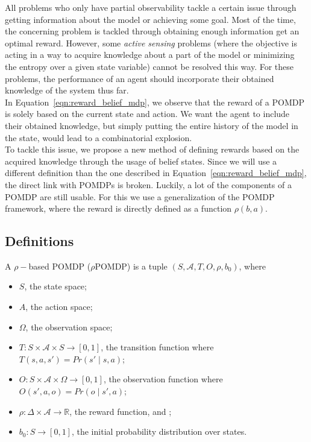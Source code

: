 All problems who only have partial observability tackle a certain issue through getting information about the model or achieving some goal. Most of the time, the concerning problem is tackled through obtaining enough information get an optimal reward. However, some \textit{active sensing} problems (where the objective is acting in a way to acquire knowledge about a part of the model or minimizing the entropy over a given state
variable) cannot be resolved this way. For these problems, the performance of an agent should incorporate their obtained knowledge of the system thus far. \\

In Equation~\ref{eqn:reward_belief_mdp}, we observe that the reward of a POMDP is solely based on the current state and action. We want the agent to include their obtained knowledge, but simply putting the entire history of the model in the state, would lead to a combinatorial explosion. \\

To tackle this issue, we propose a new method of defining rewards based on the acquired knowledge through the usage of belief states. Since we will use a different definition than the one described in Equation~\ref{eqn:reward_belief_mdp}, the direct link with POMDPs is broken. Luckily, a lot of the components of a POMDP are still usable. For this we use a generalization of the POMDP framework, where the reward is directly defined as a function $\rho(b,a)$.

\subsection{Definitions}
\begin{definition}
	A $\rho-$based POMDP ($\rho$POMDP) is a tuple $(S,\mathcal{A},T,O,\rho,b_0)$, where
		\begin{itemize}
		\item $S$, the state space;
		\item $A$, the action space;
		\item $\Omega$, the observation space;
		\item $T:S\times \mathcal{A} \times S \to [0,1]$, the transition function where
		$T(s,a,s')=Pr(s'\mid s,a)$;
		\item $O:S\times \mathcal{A} \times \Omega \to [0,1]$, the observation function where
		$O(s',a,o)= Pr(o\mid s',a)$;
		\item $\rho: \Delta \times \mathcal{A} \to \mathds{R}$, the reward function, and ;
		\item $b_0 : S \to [0,1]$, the initial probability distribution over states.
	\end{itemize}
\end{definition}

